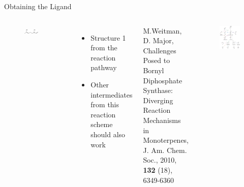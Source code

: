 \begin{frame}{Obtaining the Ligand}
\begin{columns}
\begin{figure}
\includegraphics[width=0.6\textwidth]{../Graphics/1n20Lig.eps}
\end{figure}
\begin{itemize}
\item Structure 1 from the reaction pathway
\item Other intermediates from this reaction scheme should also work
\end{itemize}\vspace{1cm}

{\tiny
M.Weitman, D. Major, Challenges Posed to Bornyl Diphosphate Synthase: Diverging Reaction Mechanisms in Monoterpenes,  J. Am. Chem. Soc., 2010, \textbf{132} (18), 6349-6360}
\begin{figure}
\includegraphics[height=0.7\textheight]{figures/System/RXNScheme.jpeg}
\end{figure}
\end{columns}
\end{frame}